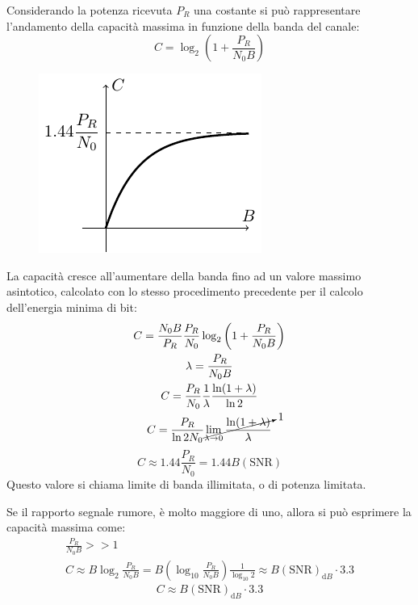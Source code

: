 \documentclass{article}
\newcommand{\df}{\mathrm{d}}
\numberwithin{equation}{subsection}
\begin{document}
Considerando la potenza ricevuta $P_R$ una costante si può rappresentare l'andamento della capacità massima in funzione della banda del canale:
\begin{equation*}
    C=\log_2\left(\displaystyle1+\frac{P_R}{N_0B}\right)
\end{equation*}
\begin{figure}[H]%
    \centering
    \includegraphics{shannon-2.pdf}%
\end{figure}
La capacità cresce all'aumentare della banda fino ad un valore massimo asintotico, calcolato con lo stesso procedimento precedente per il calcolo dell'energia minima di bit:
\begin{gather*}
    \displaystyle C=\frac{N_0B}{P_R}\frac{P_R}{N_0}\log_2\left(1+\frac{P_R}{N_0B}\right)\\
    \lambda=\displaystyle\frac{P_R}{N_0B}\\
    \displaystyle C=\frac{P_R}{N_0}\frac{1}{\lambda}\frac{\ln(1+\lambda)}{\ln2}\\
    C=\displaystyle\frac{P_R}{\ln2 N_0}\cancelto{1}{\lim_{\lambda\to0}\frac{\ln(1+\lambda)}{\lambda}}
\end{gather*}
\begin{equation}
    C\approx\displaystyle1.44\frac{P_R}{N_0}=1.44 B(\mathrm{SNR})
\end{equation}
Questo valore si chiama limite di banda illimitata, o di potenza limitata. 

Se il rapporto segnale rumore, è molto maggiore di uno, allora si può esprimere la capacità massima come:
\begin{gather*}
    \displaystyle\frac{P_R}{N_0B}>>1\\
    C\approx B\log_2\displaystyle\frac{P_R}{N_0B}=B\left(\log_{10}\frac{P_R}{N_0B}\right)\frac{1}{\log_{10}2}\approx B(\mathrm{SNR})_{\df B}\cdot3.3
\end{gather*}
\begin{equation}
    C\approx B(\mathrm{SNR})_{\df B}\cdot3.3
\end{equation}
\end{document}
